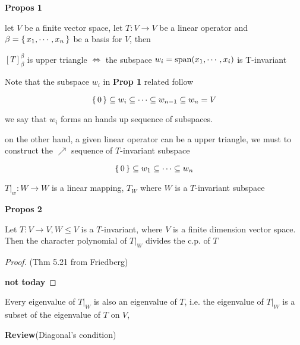 \textbf{Propos 1}

let $V$ be a finite vector space, let $T:V \rightarrow V$ be a linear operator and $\beta = \left\{ \,x_1,\cdots,x_n \,\right\}$ be a basis for $V$, then

\begin{center}
	$[T]^{\beta}_{\beta}$ is upper triangle $\Leftrightarrow$ the subspace $w_i = \text{span($x_1,\cdots,x_i$)}$ is T-invariant 
\end{center}

Note that the subspace $w_i$ in \textbf{Prop 1} related follow

$$\left\{ \,0 \,\right\} \subseteq w_i \subseteq \cdots \subseteq w_{n-1} \subseteq w_n = V$$

we say that $w_i$ forms an hands up sequence of subspaces.

on the other hand, a given linear operator can be a upper triangle, we must to construct the $\nearrow$ sequence of $T$-invariant subspace

$$\left\{ \,0 \,\right\} \subseteq w_1 \subseteq \cdots \subseteq w_n$$

$T|_{w}:W\rightarrow W$ is a linear mapping, $T_W$ where $W$ is a $T$-invariant subspace 

\newpage

\textbf{Propos 2}

Let $T:V \rightarrow V, W \leq V$ is a $T$-invariant, where $V$ is a finite dimension vector space. Then the character polynomial of $T|_W$ divides the c.p. of $T$

\begin{proof}(Thm 5.21 from Friedberg)
	
	\textbf{\color{red} not today}
	
\end{proof}

\begin{cor*}
	Every eigenvalue of $T|_W$ is also an eigenvalue of $T$, i.e. the eigenvalue of $T|_W$ is a subset of the eigenvalue of $T$ on $V$,
\end{cor*}

\textbf{Review}(Diagonal's condition)

